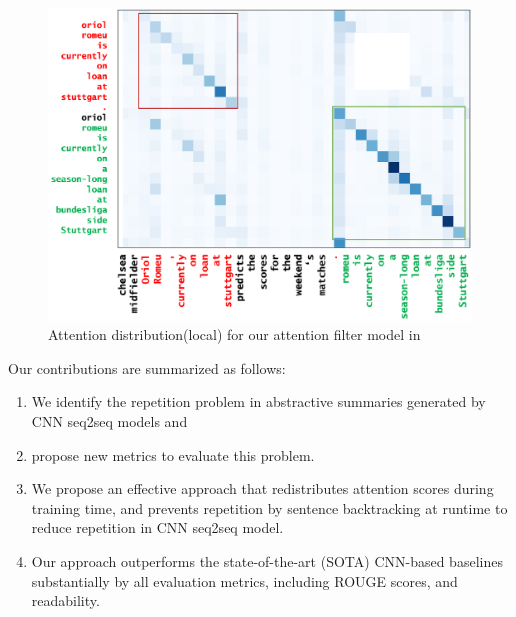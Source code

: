 {\begin{figure}[th!]
\centering
\includegraphics[width=0.9\linewidth]{map3}
\caption{Attention distribution(local) for our attention filter model in }
\label{fig:attn_map3}
\end{figure}
}\DIFaddend %

\DIFaddend
Our contributions are summarized as follows:
\begin{enumerate}
\item We identify the repetition problem in abstractive summaries generated
by CNN seq2seq models and \DIFaddbegin {}\item {}\DIFaddend propose new metrics to evaluate this problem\DIFaddbegin {}\DIFaddend .
\item We propose an effective approach that redistributes attention scores 
during training time, and prevents repetition by sentence backtracking
at runtime to reduce repetition in CNN seq2seq model.
\item Our approach
outperforms the state-of-the-art (SOTA) CNN-based baselines 
substantially by all evaluation metrics, including ROUGE scores, 
\DIFdelbegin {}\DIFdelend \DIFaddbegin {}\DIFaddend and readability.
\end{enumerate}

